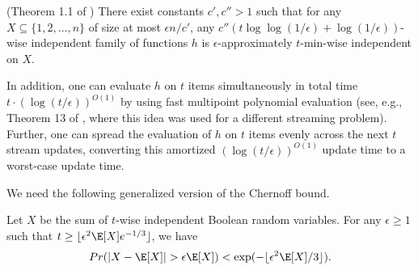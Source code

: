 \begin{theorem}\label{lm:min-wise}(Theorem 1.1 of \cite{feigenblat2011exponential})
There exist constants $c', c'' > 1$ such that for any $X \subseteq \{1, 2, \ldots, n\}$ of size at most
$\epsilon n / c'$, any $c'' (t \log \log (1/\epsilon) + \log(1/\epsilon))$-wise independent
family of functions $h$ is $\epsilon$-approximately $t$-min-wise independent on $X$. 

In addition, one can evaluate $h$ on $t$ items simultaneously
in total time $t \cdot (\log(t/\epsilon))^{O(1)}$ by using fast multipoint polynomial
evaluation (see, e.g., Theorem 13 of \cite{knpw11}, where this idea was used for a different
streaming problem). Further, one can spread the evaluation
of $h$ on $t$ items evenly across the next $t$ stream updates, converting this amortized
$(\log(t/\epsilon))^{O(1)}$ update time to a worst-case update time. 
\end{theorem}


We need the following generalized version of the Chernoff bound.

\begin{lemma}\label{lm:Kchernoff}
Let $X$ be the sum of $t$-wise independent Boolean random variables. For any $\epsilon\geq 1$ such that $t \geq \lfloor \epsilon^2\E[X]e^{-1/3} \rfloor$, we have
\begin{align*}
Pr(|X-\E[X]|>\epsilon \E[X]) < \exp(-\lfloor \epsilon^2 \E[X]/3 \rfloor).
\end{align*}
\end{lemma}

